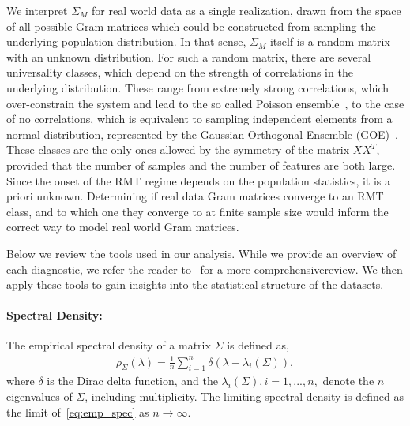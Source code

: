 \documentclass{article}
\begin{document}
 We interpret $\Sigma_M$ for real world data as a single realization, drawn from the space of all possible Gram matrices which could be constructed from sampling the underlying population distribution. In that sense, $\Sigma_M$ itself is a random matrix with an unknown distribution. For such a random matrix, there are  several universality classes, which depend on the strength of correlations in the underlying distribution. These range from extremely strong correlations, which over-constrain the system and lead to the so called Poisson ensemble~\citep{r_ratios_theory_values}, to the case of no correlations, which is equivalent to sampling independent elements from a normal distribution, represented by the Gaussian Orthogonal Ensemble (GOE)~\citep{mehta_book}. These classes are the only ones allowed by the symmetry of the matrix $XX^T$, provided that the number of samples and the number of features are both large. 
Since the onset of the RMT regime depends on the population statistics, it is a priori unknown.
 Determining if real data Gram matrices converge to an RMT class, and to which one they converge to at finite sample size would inform the correct way to model real world Gram matrices. 

Below we review the tools used in our analysis. While we provide an overview of each diagnostic, we refer the reader to~\citet{tao2012topics, Kim_2023} for a more comprehensivereview. We then apply these tools to gain insights into the statistical structure of the datasets.

\paragraph{Spectral Density:}
The empirical spectral density of a matrix $\Sigma$ is defined as,
\begin{align}\label{eq:emp_spec}
    \rho_\Sigma(\lambda)
=\frac{1}{n}\sum_{i=1}^n
\delta(\lambda - \lambda_i(\Sigma)),
\end{align}
where $\delta$ is the Dirac delta function, and the $\lambda_i (\Sigma), i = 1, . . . , n,$ denote the $n$ eigenvalues of $\Sigma$,
including multiplicity. The limiting spectral density is defined as the limit of~\cref{eq:emp_spec} as $n \to \infty$.

\end{document}
